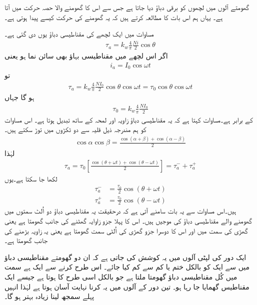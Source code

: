 گھومتے آلوں میں لچھوں کو برقی دباؤ دیا جاتا ہے جس سے اس کا گھومنے والا حصہ حرکت میں آتا ہے۔ یہاں ہم اس بات کا مطالعہ کرتے ہیں کہ یہ گھومنے کی حرکت کیسے پیدا ہوتی ہے۔

مساوات  میں ایک لچھے کی مقناطیسی دباؤ یوں دی گئی ہے۔
\begin{align}
\tau_a=k_w \frac{4}{\pi}\frac{Ni}{2} \cos \theta
\end{align}
 اگر اس لچھے میں مقناطیسی بہاؤ بھی سائن نما ہو یعنی
\begin{align}
i_a=I_0 \cos \omega t
\end{align}
تو 
\begin{align}
\tau_a=k_w \frac{4}{\pi} \frac{N I_0}{2} \cos \theta \cos \omega t=\tau_0 \cos \theta \cos \omega t
\end{align}
ہو گا جہاں
\begin{align}
\tau_0=k_w \frac{4}{\pi} \frac{N I_0}{2}
\end{align}
کے برابر ہے۔مساوات  کہتا ہے کہ یہ مقناطیسی دباؤ زاویہ  اور لمحہ  کے ساتھ تبدیل ہوتا ہے۔ اس مساوات کو ہم مندرجہ ذیل قلیہ سے دو ٹکڑوں میں توڑ سکتے ہیں۔
\begin{align*}
\cos \alpha \cos \beta =\frac{\cos (\alpha +\beta) +\cos (\alpha -\beta)}{2}
\end{align*}
لہٰذا
\begin{align}
\tau_a=\tau_0 \left [\frac{\cos (\theta +\omega t) +\cos (\theta -\omega t)}{2}\right]=\tau_a^{-}+\tau_a^{+}
\end{align}
لکھا جا سکتا ہے۔یوں
\begin{align}
\tau_a^{-}&=\frac{\tau_0}{2} \cos (\theta +\omega t)\\
\tau_a^{+}&=\frac{\tau_0}{2} \cos (\theta -\omega t)
\end{align}
ہیں۔اس مساوات سے یہ بات سامنے آتی ہے کہ درحقیقت یہ مقناطیسی دباؤ دو اُلٹ سمتوں میں گھومنے والے مقناطیسی دباؤ کی موجیں ہیں۔ اس کا پہلا جزو  زاوایہ  گھٹنے کی جانب گھومتا ہے یعنی گھڑی کی سمت میں اور اس کا دوسرا جزو  گھڑی کی اُلٹی سمت گھومتا ہے یعنی یہ زاویہ بڑھنے کی جانب گھومتا ہے۔

ایک دور کی لپٹی آلوں میں یہ کوشش کی جاتی ہے کہ ان دو گھومتے مقناطیسی دباؤ میں سے ایک کو بالکل ختم یا کم سے کم کیا جائے۔ اس طرح کرنے سے ایک ہے سمت میں کُل مقناطیسی دباؤ گھومتا ملتا ہے جو بالکل اسی طرح کا ہوتا ہے جیسے ایک مقناطیس گھمایا جا رہا ہو۔ تین دور کے آلوں میں یہ کرنا نہایت آسان ہوتا ہے لہٰذا انہیں پہلے سمجھ لینا زیادہ بہتر ہو گا۔

